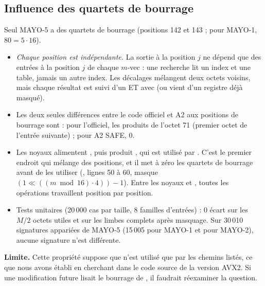 \subsection{Influence des quartets de bourrage}\label{sec:bourrage}
Seul MAYO-5 a des quartets de bourrage (positions 142 et 143 ; pour MAYO-1, $80=5\cdot16$).
\begin{itemize}
\item \Pc{} \emph{Chaque position est indépendante.} La sortie à la position $j$ ne dépend que des entrées à la position $j$ de chaque $m$-vec : une recherche lit un index et une table, jamais un autre index. Les décalages  mélangent deux octets voisins, mais chaque résultat est suivi d'un ET avec  (ou vient d'un registre déjà masqué).
\item \Pc{} Les deux seules différences entre le code officiel et A2 aux positions de bourrage sont : pour l'officiel, les produits de l'octet 71 (premier octet de l'entrée suivante) ; pour A2 SAFE, 0.
\item \Pc{} Les noyaux alimentent , puis  produit , qui est utilisé par . C'est le premier endroit qui mélange des positions, et il met à zéro les quartets de bourrage avant de les utiliser (, lignes 50 à 60, masque $(1\ll((m\bmod16)\cdot4))-1$). Entre les noyaux et , toutes les opérations travaillent position par position.
\item \Pe{} Tests unitaires (20\,000 cas par taille, 8 familles d'entrées) : 0 écart sur les $M/2$ octets utiles et sur les limbes complets après masquage. Sur 30\,010 signatures appariées de MAYO-5 (15\,005 pour MAYO-1 et pour MAYO-2), aucune signature n'est différente.
\end{itemize}
\textbf{Limite.} Cette propriété suppose que  n'est utilisé que par les chemins listés, ce que nous avons établi en cherchant dans le code source de la version AVX2. Si une modification future lisait le bourrage de , il faudrait réexaminer la question.

